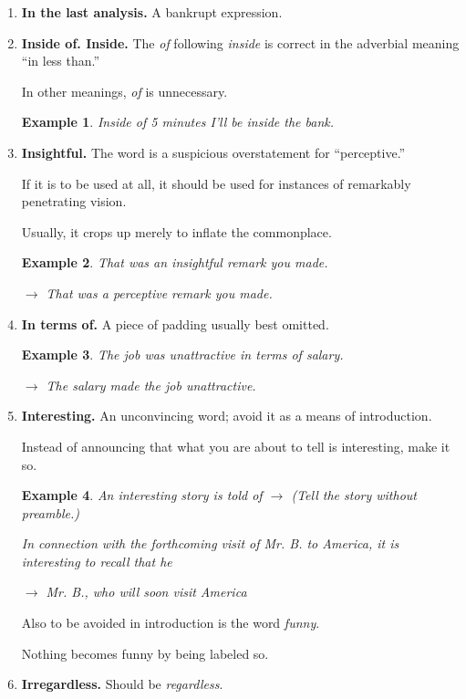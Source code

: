 \documentclass{book}
\numberwithin{equation}{section}
\newtheorem{example}{Example}[chapter]
\begin{document}
\begin{enumerate}
    But \textit{as regards} is correct, and means the same thing.
    \item \textbf{In the last analysis.} A bankrupt expression.
    \item \textbf{Inside of. Inside.} The \textit{of} following \textit{inside} is correct in the adverbial meaning ``in less than.''
    
    In other meanings, \textit{of} is unnecessary.
    \begin{example}
        Inside of 5 minutes I'll be inside the bank.
    \end{example}
    \item \textbf{Insightful.} The word is a suspicious overstatement for ``perceptive.''
    
    If it is to be used at all, it should be used for instances of remarkably penetrating vision.
    
    Usually, it crops up merely to inflate the commonplace.
    \begin{example}
        That was an insightful remark you made.
        
        $\to$ That was a perceptive remark you made.
    \end{example}
    \item \textbf{In terms of.} A piece of padding usually best omitted.
    \begin{example}
        The job was unattractive in terms of salary.
        
        $\to$ The salary made the job unattractive.
    \end{example}
    \item \textbf{Interesting.} An unconvincing word; avoid it as a means of introduction.
    
    Instead of announcing that what you are about to tell is interesting, make it so.
    \begin{example}
        An interesting story is told of $\to$ (Tell the story without preamble.)
        
        In connection with the forthcoming visit of Mr. B. to America, it is interesting to recall that he
        
        $\to$ Mr. B., who will soon visit America
    \end{example}
    Also to be avoided in introduction is the word \textit{funny}.
    
    Nothing becomes funny by being labeled so.
    \item \textbf{Irregardless.} Should be \textit{regardless}.
    

\end{enumerate}
\end{document}
